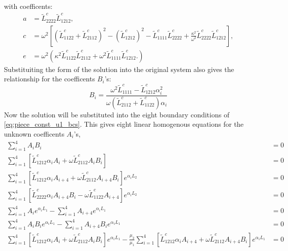 \documentclass[11pt]{report}
\begin{document}
\begin{appendices}
\begin{equation}
\end{equation}
with coefficents:
\begin{equation*}
\begin{aligned}
  a &= \tilde{L}^{c}_{2222}\tilde{L}^{c}_{1212}, \\
  c &= \omega^2 \left[ \left ( \tilde{L}^{c}_{1122} + \tilde{L}^{c}_{2112}\right )^2 - \left ( \tilde{L}^{c}_{1212} \right )^2 - \tilde{L}^{c}_{1111}\tilde{L}^{c}_{2222} + \frac{\kappa^2}{\omega^2}\tilde{L}^{c}_{2222}\tilde{L}^{c}_{1212}    \right ], \\
  e &= \omega^2 \left( \kappa^2 \tilde{L}^{c}_{1122}\tilde{L}^{c}_{2112} + \omega^2 \tilde{L}^{c}_{1111}\tilde{L}^{c}_{1212}. \right)
\end{aligned}
\end{equation*}
Substituiting the form of the solution into the original system also gives the relationship for the coefficents $B_i$'s:
\begin{equation}
B_i = \frac {\omega^2 \tilde{L}^{c}_{1111}  - \tilde{L}^{c}_{1212} \alpha_i^2 }
            {\omega \left (\tilde{L}^{c}_{2112} + \tilde{L}^{c}_{1122} \right) \alpha_i}
\end{equation}
Now the solution will be substituted into the eight boundary conditions of \eqref{eq:piece_const_u1_bcs}. This gives eight linear homogenous equations for the unknown coefficents $A_i$'s,
\begin{equation}
\begin{aligned}
\sum_{i=1}^4 A_i B_i &= 0 \\
\sum_{i=1}^4 \left[ \tilde{L}^c_{1212} \alpha_i A_i + \omega \tilde{L}^c_{2112} A_i B_i \right] &= 0 \\
\sum_{i=1}^4 \left[ \tilde{L}^c_{1212} \alpha_i A_{i+4} + \omega \tilde{L}^c_{2112} A_{i+4} B_i \right] e^{\alpha_i L_2} &= 0 \\
\sum_{i=1}^4 \left[ \tilde{L}^c_{2222} \alpha_i A_{i+4} B_i - \omega \tilde{L}^c_{1122} A_{i+4} \right] e^{\alpha_i L_2} &= 0 \\
\sum_{i=1}^4 A_i e^{\alpha_i L_1} - \sum_{i=1}^4 A_{i+4}e^{\alpha_i L_1} &= 0 \\
\sum_{i=1}^4 A_i B_i e^{\alpha_i L_1} - \sum_{i=1}^4 A_{i+4} B_i e^{\alpha_i L_1} &= 0 \\
\sum_{i=1}^4 \left[ \tilde{L}^c_{1212} \alpha_i A_{i} + \omega \tilde{L}^c_{2112} A_{i} B_i \right] e^{\alpha_i L_1} - \frac{\mu_2}{\mu_1}\sum_{i=1}^4 \left[ \tilde{L}^c_{1212} \alpha_i A_{i+4} + \omega \tilde{L}^c_{2112} A_{i+4} B_i \right] e^{\alpha_i L_1} &= 0 \\

\end{aligned}
\end{equation}
\end{appendices}
\end{document}
